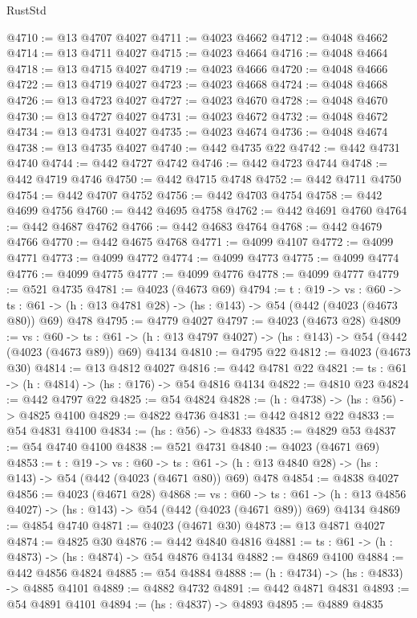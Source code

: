 \begin{lexlean}{RustStd}
\begin{coremodule}
@4710 := @13 @4707 @4027
@4711 := @4023 @4662
@4712 := @4048 @4662
@4714 := @13 @4711 @4027
@4715 := @4023 @4664
@4716 := @4048 @4664
@4718 := @13 @4715 @4027
@4719 := @4023 @4666
@4720 := @4048 @4666
@4722 := @13 @4719 @4027
@4723 := @4023 @4668
@4724 := @4048 @4668
@4726 := @13 @4723 @4027
@4727 := @4023 @4670
@4728 := @4048 @4670
@4730 := @13 @4727 @4027
@4731 := @4023 @4672
@4732 := @4048 @4672
@4734 := @13 @4731 @4027
@4735 := @4023 @4674
@4736 := @4048 @4674
@4738 := @13 @4735 @4027
@4740 := @442 @4735 @22
@4742 := @442 @4731 @4740
@4744 := @442 @4727 @4742
@4746 := @442 @4723 @4744
@4748 := @442 @4719 @4746
@4750 := @442 @4715 @4748
@4752 := @442 @4711 @4750
@4754 := @442 @4707 @4752
@4756 := @442 @4703 @4754
@4758 := @442 @4699 @4756
@4760 := @442 @4695 @4758
@4762 := @442 @4691 @4760
@4764 := @442 @4687 @4762
@4766 := @442 @4683 @4764
@4768 := @442 @4679 @4766
@4770 := @442 @4675 @4768
@4771 := @4099 @4107
@4772 := @4099 @4771
@4773 := @4099 @4772
@4774 := @4099 @4773
@4775 := @4099 @4774
@4776 := @4099 @4775
@4777 := @4099 @4776
@4778 := @4099 @4777
@4779 := @521 @4735
@4781 := @4023 (@4673 @69)
@4794 := {t : @19} ->
  {vs : @60} ->
  {ts : @61} -> (h : @13 @4781 @28) -> (hs : @143) -> @54 (@442 (@4023 (@4673 @80)) @69) @478
@4795 := @4779 @4027
@4797 := @4023 (@4673 @28)
@4809 := {vs : @60} ->
  {ts : @61} -> (h : @13 @4797 @4027) -> (hs : @143) -> @54 (@442 (@4023 (@4673 @89)) @69) @4134
@4810 := @4795 @22
@4812 := @4023 (@4673 @30)
@4814 := @13 @4812 @4027
@4816 := @442 @4781 @22
@4821 := {ts : @61} -> (h : @4814) -> (hs : @176) -> @54 @4816 @4134
@4822 := @4810 @23
@4824 := @442 @4797 @22
@4825 := @54 @4824
@4828 := (h : @4738) -> (hs : @56) -> @4825 @4100
@4829 := @4822 @4736
@4831 := @442 @4812 @22
@4833 := @54 @4831 @4100
@4834 := (hs : @56) -> @4833
@4835 := @4829 @53
@4837 := @54 @4740 @4100
@4838 := @521 @4731
@4840 := @4023 (@4671 @69)
@4853 := {t : @19} ->
  {vs : @60} ->
  {ts : @61} -> (h : @13 @4840 @28) -> (hs : @143) -> @54 (@442 (@4023 (@4671 @80)) @69) @478
@4854 := @4838 @4027
@4856 := @4023 (@4671 @28)
@4868 := {vs : @60} ->
  {ts : @61} -> (h : @13 @4856 @4027) -> (hs : @143) -> @54 (@442 (@4023 (@4671 @89)) @69) @4134
@4869 := @4854 @4740
@4871 := @4023 (@4671 @30)
@4873 := @13 @4871 @4027
@4874 := @4825 @30
@4876 := @442 @4840 @4816
@4881 := {ts : @61} -> (h : @4873) -> (hs : @4874) -> @54 @4876 @4134
@4882 := @4869 @4100
@4884 := @442 @4856 @4824
@4885 := @54 @4884
@4888 := (h : @4734) -> (hs : @4833) -> @4885 @4101
@4889 := @4882 @4732
@4891 := @442 @4871 @4831
@4893 := @54 @4891 @4101
@4894 := (hs : @4837) -> @4893
@4895 := @4889 @4835

\end{coremodule}
\end{lexlean}
